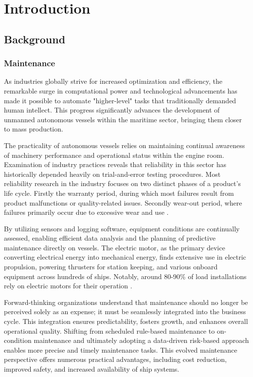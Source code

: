 \section{Introduction}
\label{sec:introduction}
\subsection{Background}
\subsubsection{Maintenance}
As industries globally strive for increased optimization and efficiency, the remarkable surge in computational power and technological advancements has made it possible to automate "higher-level" tasks that traditionally demanded human intellect. This progress significantly advances the development of unmanned autonomous vessels within the maritime sector, bringing them closer to mass production.

The practicality of autonomous vessels relies on maintaining continual awareness of machinery performance and operational status within the engine room. Examination of industry practices reveals that reliability in this sector has historically depended heavily on trial-and-error testing procedures. Most reliability research in the industry focuses on two distinct phases of a product's life cycle. Firstly the warranty period, during which most failures result from product malfunctions or quality-related issues. Secondly wear-out period, where failures primarily occur due to excessive wear and use \cite{thomas_warranty_1999}.

By utilizing sensors and logging software, equipment conditions are continually assessed, enabling efficient data analysis and the planning of predictive maintenance directly on vessels. The electric motor, as the primary device converting electrical energy into mechanical energy, finds extensive use in electric propulsion, powering thrusters for station keeping, and various onboard equipment across hundreds of ships. Notably, around 80-90\% of load installations rely on electric motors for their operation \cite{han_motor_2019}.

Forward-thinking organizations understand that maintenance should no longer be perceived solely as an expense; it must be seamlessly integrated into the business cycle. This integration ensures predictability, fosters growth, and enhances overall operational quality. Shifting from scheduled rule-based maintenance to on-condition maintenance and ultimately adopting a data-driven risk-based approach enables more precise and timely maintenance tasks. This evolved maintenance perspective offers numerous practical advantages, including cost reduction, improved safety, and increased availability of ship systems.

